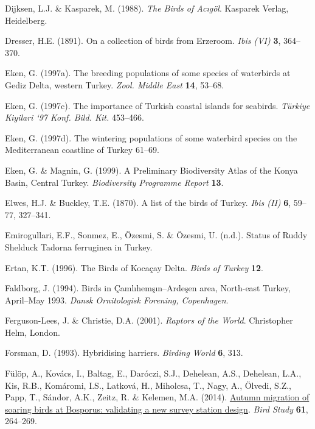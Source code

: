 \documentclass[
  a4paper,
  DIV=11,
  numbers=noendperiod]{scrreprt}
\newlength{\cslhangindent}
\newenvironment{CSLReferences}[2] %
 {\begin{list}{}{%
  \setlength{\itemindent}{0pt}
  \setlength{\leftmargin}{0pt}
  \setlength{\parsep}{0pt}
  \ifodd #1
   \setlength{\leftmargin}{\cslhangindent}
   \setlength{\itemindent}{-1\cslhangindent}
  \fi
  \setlength{\itemsep}{#2\baselineskip}}}
 {\end{list}}
\begin{document}
\begin{CSLReferences}{1}{1}
Dijksen, L.J. \& Kasparek, M. (1988). \emph{{The Birds of Acıgöl}}.
Kasparek Verlag, Heidelberg.

Dresser, H.E. (1891). {On a collection of birds from Erzeroom}.
\emph{Ibis (VI)} \textbf{3}, 364--370.

Eken, G. (1997a). {The breeding populations of some species of
waterbirds at Gediz Delta, western Turkey}. \emph{Zool. Middle East}
\textbf{14}, 53--68.

Eken, G. (1997c). {The importance of Turkish coastal islands for
seabirds}. \emph{Türkiye Kiyilari `97 Konf. Bild. Kit.} 453--466.

Eken, G. (1997d). {The wintering populations of some waterbird species
on the Mediterranean coastline of Turkey} 61--69.

Eken, G. \& Magnin, G. (1999). {A Preliminary Biodiversity Atlas of the
Konya Basin, Central Turkey}. \emph{Biodiversity Programme Report}
\textbf{13}.

Elwes, H.J. \& Buckley, T.E. (1870). {A list of the birds of Turkey}.
\emph{Ibis (II)} \textbf{6}, 59--77, 327--341.

Emirogullari, E.F., Sonmez, E., Özesmi, S. \& Özesmi, U. (n.d.). {Status
of Ruddy Shelduck Tadorna ferruginea in Turkey}.

Ertan, K.T. (1996). {The Birds of Kocaçay Delta}. \emph{Birds of Turkey}
\textbf{12}.

Faldborg, J. (1994). {Birds in Çamlıhemşın--Ardeşen area, North-east
Turkey, April--May 1993}. \emph{Dansk Ornitologisk Forening,
Copenhagen}.

Ferguson-Lees, J. \& Christie, D.A. (2001). \emph{{Raptors of the
World}}. Christopher Helm, London.

Forsman, D. (1993). {Hybridising harriers}. \emph{Birding World}
\textbf{6}, 313.

Fülöp, A., Kovács, I., Baltag, E., Daróczi, S.J., Dehelean, A.S.,
Dehelean, L.A., Kis, R.B., Komáromi, I.S., Latková, H., Miholcsa, T.,
Nagy, A., Ölvedi, S.Z., Papp, T., Sándor, A.K., Zeitz, R. \& Kelemen,
M.A. (2014). \href{https://doi.org/10.1080/00063657.2014.907236}{{Autumn
migration of soaring birds at Bosporus: validating a new survey station
design}}. \emph{Bird Study} \textbf{61}, 264--269.


\end{CSLReferences}
\end{document}
